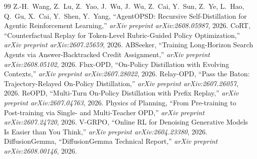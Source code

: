 \documentclass[11pt,a4paper]{article}
\begin{document}
\begin{thebibliography}{99}
 Z.-H.~Wang, Z.~Lu, Z.~Yao, J.~Wu, J.~Wu, Z.~Cai, Y.~Sun, Z.~Ye, L.~Hao, Q.~Gu, X.~Cai, Y.~Shen, Y.~Yang, ``AgentOPSD: Recursive Self-Distillation for Agentic Reinforcement Learning,'' \emph{arXiv preprint arXiv:2608.05987}, 2026.
 CoRT, ``Counterfactual Replay for Token-Level Rubric-Guided Policy Optimization,'' \emph{arXiv preprint arXiv:2607.25659}, 2026.
 ABSeeker, ``Training Long-Horizon Search Agents via Answer-Backtracked Credit Assignment,'' \emph{arXiv preprint arXiv:2608.05102}, 2026.
 Flux-OPD, ``On-Policy Distillation with Evolving Contexts,'' \emph{arXiv preprint arXiv:2607.28022}, 2026.
 Relay-OPD, ``Pass the Baton: Trajectory-Relayed On-Policy Distillation,'' \emph{arXiv preprint arXiv:2607.26057}, 2026.
 ReOPD, ``Multi-Turn On-Policy Distillation with Prefix Replay,'' \emph{arXiv preprint arXiv:2607.04763}, 2026.
 Physics of Planning, ``From Pre-training to Post-training via Single- and Multi-Teacher OPD,'' \emph{arXiv preprint arXiv:2607.24720}, 2026.
 V-GRPO, ``Online RL for Denoising Generative Models Is Easier than You Think,'' \emph{arXiv preprint arXiv:2604.23380}, 2026.
 DiffusionGemma, ``DiffusionGemma Technical Report,'' \emph{arXiv preprint arXiv:2608.00146}, 2026.
\end{thebibliography}
\end{document}
